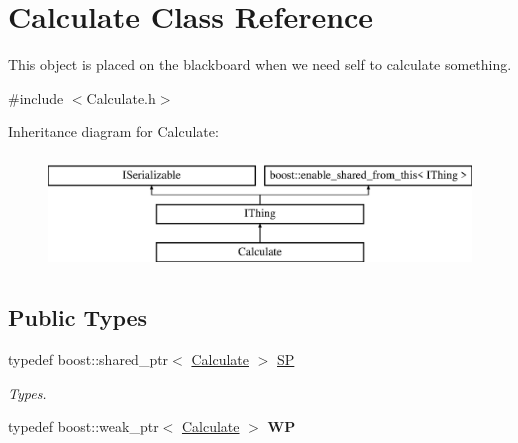 \hypertarget{class_calculate}{}\section{Calculate Class Reference}
\label{class_calculate}


This object is placed on the blackboard when we need self to calculate something.  




{\ttfamily \#include $<$Calculate.\+h$>$}

Inheritance diagram for Calculate\+:\begin{figure}[H]
\begin{center}
\leavevmode
\includegraphics[height=3.000000cm]{class_calculate}
\end{center}
\end{figure}
\subsection*{Public Types}
\begin{DoxyCompactItemize}
\item 
\mbox{\label{class_calculate_a45027220b95e94879281ce0d57423082}} 
typedef boost\+::shared\+\_\+ptr$<$ \hyperlink{class_calculate}{Calculate} $>$ \hyperlink{class_calculate_a45027220b95e94879281ce0d57423082}{SP}
\begin{DoxyCompactList}\small\item\em Types. \end{DoxyCompactList}\item 
\mbox{\label{class_calculate_a25c76395c135b19bced534cfcf64eb64}} 
typedef boost\+::weak\+\_\+ptr$<$ \hyperlink{class_calculate}{Calculate} $>$ {\bfseries WP}
\end{DoxyCompactItemize}
